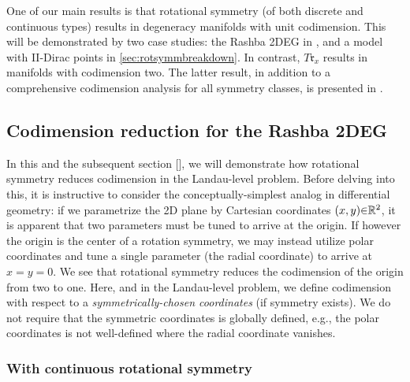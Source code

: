 \documentclass[aps, prb, showpacs, twocolumn, notitlepage, superscriptaddress]{revtex4-1}
\begin{document}
One of our main results is that  rotational symmetry (of both discrete and continuous types) results in degeneracy manifolds with unit codimension. This will be demonstrated by two  case studies: the Rashba 2DEG in , and a model with II-Dirac points in \ref{sec:rotsymmbreakdown}. In contrast,  $T\mathfrak{r}_x$ results in manifolds with codimension two. The latter result, in addition to a comprehensive codimension analysis for all symmetry classes, is presented in . 





\subsection{Codimension reduction for the Rashba 2DEG}


In this and the subsequent section [], we will demonstrate how rotational symmetry reduces codimension in the Landau-level problem. Before delving into this, it is instructive to consider the conceptually-simplest analog in differential geometry: if we parametrize the 2D plane by Cartesian coordinates $(x,y){\in}\mathbb{R}^2$, it is apparent that two parameters must be tuned to arrive at the origin. If however the origin is the center of a rotation symmetry, we may instead utilize polar coordinates and tune a single parameter (the radial coordinate) to arrive at $x{=}y{=}0$. We see that rotational symmetry reduces the codimension of the origin from two to one. Here, and in the  Landau-level problem, we define codimension with respect to a \textit{symmetrically-chosen coordinates} (if symmetry exists). We do not require that the symmetric coordinates is globally defined, e.g., the polar coordinates is not well-defined where the radial coordinate vanishes.


\subsubsection{With continuous rotational symmetry}
\end{document}
